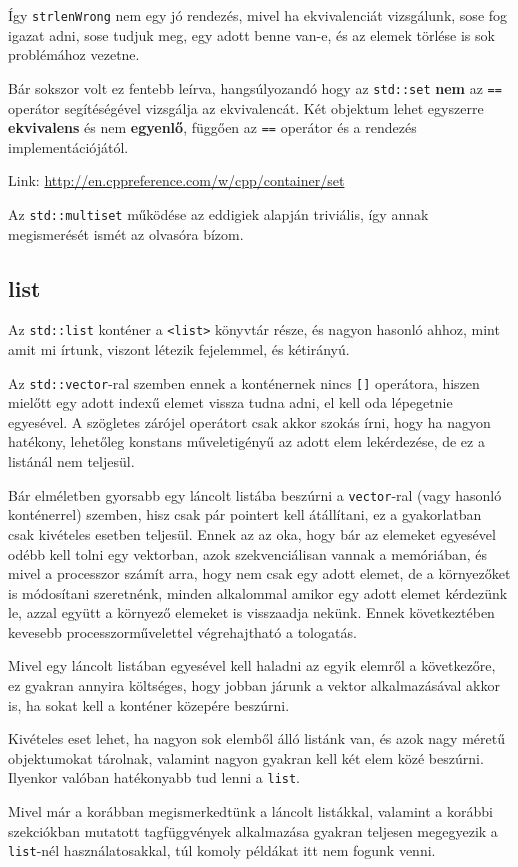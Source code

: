 \documentclass[a4paper,11.5pt,table]{article}
\begin{document}
	Így \texttt{strlenWrong} nem egy jó rendezés, mivel ha ekvivalenciát vizsgálunk, sose fog igazat adni, sose tudjuk meg, egy adott benne van-e, és az elemek törlése is sok problémához vezetne.
	\begin{note}
		Bár sokszor volt ez fentebb leírva, hangsúlyozandó hogy az \texttt{std::set} \textbf{nem} az \texttt{==} operátor segítéségével vizsgálja az ekvivalencát. Két objektum lehet egyszerre \textbf{ekvivalens} és nem \textbf{egyenlő}, függően az \texttt{==} operátor és a rendezés implementációjától.
	\end{note}
	Link: \url{http://en.cppreference.com/w/cpp/container/set}
	
	\begin{note}
		Az \texttt{std::multiset} működése az eddigiek alapján triviális, így annak megismerését ismét az olvasóra bízom.
	\end{note}
	\subsection{list}
	Az \texttt{std::list} konténer a \texttt{<list>} könyvtár része, és nagyon hasonló ahhoz, mint amit mi írtunk, viszont létezik fejelemmel, és kétirányú.
	\smallskip
	
	Az \texttt{std::vector}-ral szemben ennek a konténernek nincs \texttt{[]} operátora, hiszen mielőtt egy adott indexű elemet vissza tudna adni, el kell oda lépegetnie egyesével. A szögletes zárójel operátort csak akkor szokás írni, hogy ha nagyon hatékony, lehetőleg konstans műveletigényű az adott elem lekérdezése, de ez a listánál nem teljesül.
	\begin{note}
		Bár elméletben gyorsabb egy láncolt listába beszúrni a \texttt{vector}-ral (vagy hasonló konténerrel) szemben, hisz csak pár pointert kell átállítani, ez a gyakorlatban csak kivételes esetben teljesül. Ennek az az oka, hogy bár az elemeket egyesével odébb kell tolni egy vektorban, azok szekvenciálisan vannak a memóriában, és mivel a processzor számít arra, hogy nem csak egy adott elemet, de a környezőket is módosítani szeretnénk, minden alkalommal amikor egy adott elemet kérdezünk le, azzal együtt a környező elemeket is visszaadja nekünk. Ennek következtében kevesebb processzorművelettel végrehajtható a tologatás.
		
		Mivel egy láncolt listában egyesével kell haladni az egyik elemről a következőre, ez gyakran annyira költséges, hogy jobban járunk a vektor alkalmazásával akkor is, ha sokat kell a konténer közepére beszúrni.
		
		Kivételes eset lehet, ha nagyon sok elemből álló listánk van, és azok nagy méretű objektumokat tárolnak, valamint nagyon gyakran kell két elem közé beszúrni. Ilyenkor valóban hatékonyabb tud lenni a \texttt{list}.
	\end{note}
	Mivel már a korábban megismerkedtünk a láncolt listákkal, valamint a korábbi szekciókban mutatott tagfüggvények alkalmazása gyakran teljesen megegyezik a \texttt{list}-nél használatosakkal, túl komoly példákat itt nem fogunk venni. 
	
\end{document}
